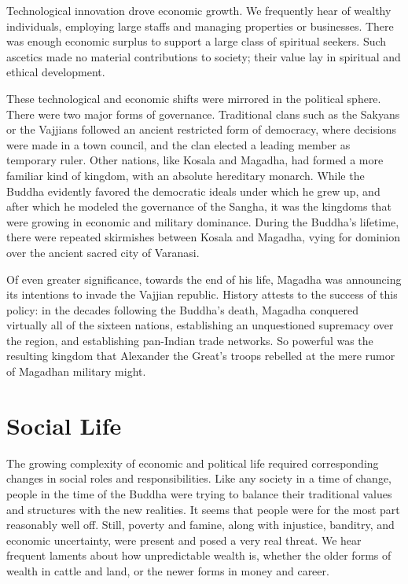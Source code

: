 \documentclass[12pt,openany]{book}%
\begin{document}
Technological innovation drove economic growth. We frequently hear of wealthy individuals, employing large staffs and managing properties or businesses. There was enough economic surplus to support a large class of spiritual seekers. Such ascetics made no material contributions to society; their value lay in spiritual and ethical development.

These technological and economic shifts were mirrored in the political sphere. There were two major forms of governance. Traditional clans such as the Sakyans or the Vajjians followed an ancient restricted form of democracy, where decisions were made in a town council, and the clan elected a leading member as temporary ruler. Other nations, like Kosala and Magadha, had formed a more familiar kind of kingdom, with an absolute hereditary monarch. While the Buddha evidently favored the democratic ideals under which he grew up, and after which he modeled the governance of the Sangha, it was the kingdoms that were growing in economic and military dominance. During the Buddha’s lifetime, there were repeated skirmishes between Kosala and Magadha, vying for dominion over the ancient sacred city of Varanasi.

Of even greater significance, towards the end of his life, Magadha was announcing its intentions to invade the Vajjian republic. History attests to the success of this policy: in the decades following the Buddha’s death, Magadha conquered virtually all of the sixteen nations, establishing an unquestioned supremacy over the region, and establishing pan-Indian trade networks. So powerful was the resulting kingdom that Alexander the Great’s troops rebelled at the mere rumor of Magadhan military might.

\section*{Social Life}

The growing complexity of economic and political life required corresponding changes in social roles and responsibilities. Like any society in a time of change, people in the time of the Buddha were trying to balance their traditional values and structures with the new realities. It seems that people were for the most part reasonably well off. Still, poverty and famine, along with injustice, banditry, and economic uncertainty, were present and posed a very real threat. We hear frequent laments about how unpredictable wealth is, whether the older forms of wealth in cattle and land, or the newer forms in money and career.
\end{document}
